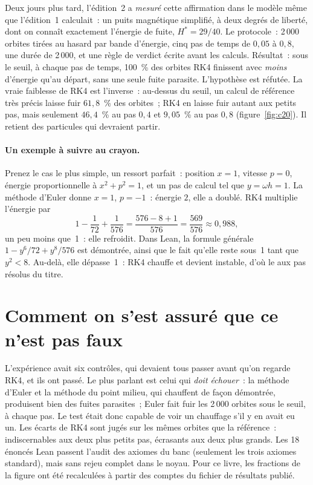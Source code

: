 Deux jours plus tard, l'édition~2 a \emph{mesuré} cette affirmation dans le modèle même que l'édition~1 calculait~:
un puits magnétique simplifié, à deux degrés de liberté, dont on connaît exactement l'énergie de fuite,
$H^*=29/40$. Le protocole~: 2\,000 orbites tirées au hasard par bande d'énergie, cinq pas de temps de $0{,}05$ à
$0{,}8$, une durée de 2\,000, et une règle de verdict écrite avant les calculs. Résultat~: sous le seuil, à chaque
pas de temps, 100~\% des orbites RK4 finissent avec \emph{moins} d'énergie qu'au départ, sans une seule fuite
parasite. L'hypothèse est réfutée. La vraie faiblesse de RK4 est l'inverse~: au-dessus du seuil, un calcul de
référence très précis laisse fuir $61{,}8$~\% des orbites~; RK4 en laisse fuir autant aux petits pas, mais seulement
$46{,}4$~\% au pas $0{,}4$ et $9{,}05$~\% au pas $0{,}8$ (figure~\ref{fig:c20}). Il retient des particules qui
devraient partir.

\paragraph{Un exemple à suivre au crayon.} Prenez le cas le plus simple, un ressort parfait~: position $x=1$,
vitesse $p=0$, énergie proportionnelle à $x^2+p^2=1$, et un pas de calcul tel que $y=\omega h=1$. La méthode d'Euler donne
$x=1$, $p=-1$~: énergie $2$, elle a doublé. RK4 multiplie l'énergie par
\[
1-\frac{1}{72}+\frac{1}{576}=\frac{576-8+1}{576}=\frac{569}{576}\approx0{,}988,
\]
un peu moins que~1~: elle refroidit. Dans Lean, la formule générale $1-y^6/72+y^8/576$ est démontrée, ainsi que le
fait qu'elle reste sous~1 tant que $y^2<8$. Au-delà, elle dépasse~1~: RK4 chauffe et devient instable, d'où le
\og aux pas résolus\fg{} du titre.

\section*{Comment on s'est assuré que ce n'est pas faux}

L'expérience avait six contrôles, qui devaient tous passer avant qu'on regarde RK4, et ils ont passé. Le plus
parlant est celui qui \emph{doit échouer}~: la méthode d'Euler et la méthode du point milieu, qui chauffent de façon
démontrée, produisent bien des fuites parasites~; Euler fait fuir les 2\,000 orbites sous le seuil, à chaque pas. Le
test était donc capable de voir un chauffage s'il y en avait eu un. Les écarts de RK4 sont jugés sur les mêmes
orbites que la référence~: indiscernables aux deux plus petits pas, écrasants aux deux plus grands. Les 18 énoncés
Lean passent l'audit des axiomes du banc (seulement les trois axiomes standard), mais sans rejeu complet dans le
noyau. Pour ce livre, les fractions de la figure ont été recalculées à partir des comptes du fichier de résultats
publié.

